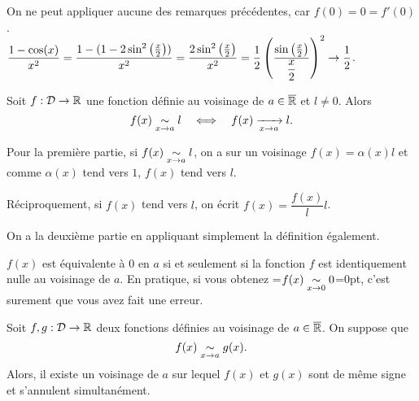\documentclass{magnolia}
\begin{document}
\begin{sol}
On ne peut appliquer aucune des remarques précédentes, car $f(0)=0=f'(0)$.\\
$\dfrac{1-\cos(x)}{x^2}=\dfrac{1-(1-2\sin^2\left(\frac{x}{2}\right))}{x^2}=\dfrac{2\sin^2\left(\frac{x}{2}\right)}{x^2}=\dfrac{1}{2}\left(\dfrac{\sin\left(\frac{x}{2}\right)}{\dfrac{x}{2}}\right)^2\to \dfrac{1}{2}$.
\end{sol}


\begin{proposition}[utile=-3]
Soit $f:\mathcal{D}\to\mathbb{R}$ une fonction définie au voisinage de $a\in\overline{\mathbb{R}}$ et $l\neq 0$. Alors
\[f(x)\underset{x\rightarrow a}{\sim}l \quad\Longleftrightarrow\quad f(x)\xrightarrow[x\rightarrow a]{}l.\]
\end{proposition}

\begin{preuve}
Pour la première partie, si $\displaystyle f(x)\underset{x\rightarrow a}{\sim}l$, on a sur un voisinage $f(x)=\alpha(x)l$ et comme $\alpha(x)$ tend vers $1$, $f(x)$ tend vers $l$.

Réciproquement, si $f(x)$ tend vers $l$, on écrit $f(x)=\dfrac{f(x)}{l}l$.

On a la deuxième partie en appliquant simplement la définition également.

\end{preuve}

\begin{remarqueUnique}
\remarque $f(x)$ est équivalente à 0 en $a$ si et seulement si la fonction $f$ est identiquement nulle au voisinage de $a$. En pratique, si vous obtenez 
  =\hbox{$f(x)\underset{x\rightarrow 0}{\sim}0$}=0pt,
  c'est surement que vous avez fait une erreur.
\end{remarqueUnique}

\begin{proposition}[utile=-3]
Soit $f,g:\mathcal{D}\to\mathbb{R}$ deux fonctions définies au voisinage de $a\in\overline{\mathbb{R}}$. On suppose
que
\[f(x)\underset{x\rightarrow a}{\sim} g(x).\]
Alors, il existe un voisinage de $a$ sur lequel $f(x)$ et $g(x)$ sont de
même signe et s'annulent simultanément.  
\end{proposition}
\end{document}
